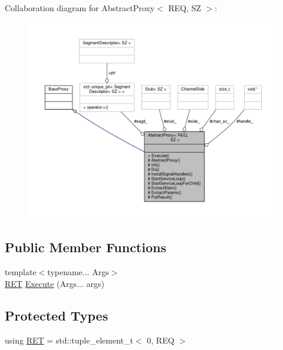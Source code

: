 Collaboration diagram for Abstract\+Proxy$<$ R\+EQ, SZ $>$\+:
\nopagebreak
\begin{figure}[H]
\begin{center}
\leavevmode
\includegraphics[width=350pt]{classAbstractProxy__coll__graph}
\end{center}
\end{figure}
\subsection*{Public Member Functions}
\begin{DoxyCompactItemize}
\item 
{\footnotesize template$<$typename... Args$>$ }\\\hyperlink{classAbstractProxy_ab2af611a27c14916a27d0e9249f0291b}{R\+ET} \hyperlink{classAbstractProxy_ad1aecd99b6f9da7cbe0c2977f4462040}{Execute} (Args... args)
\end{DoxyCompactItemize}
\subsection*{Protected Types}
\begin{DoxyCompactItemize}
\item 
using \hyperlink{classAbstractProxy_ab2af611a27c14916a27d0e9249f0291b}{R\+ET} = std\+::tuple\+\_\+element\+\_\+t$<$ 0, R\+EQ $>$
\end{DoxyCompactItemize}
